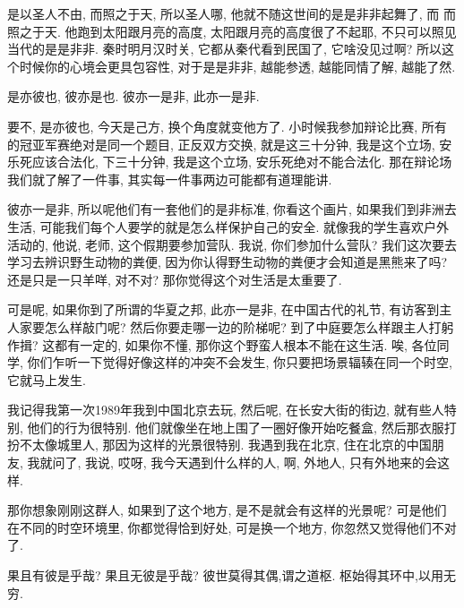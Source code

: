 \documentclass[11pt]{article}
\begin{document}
{\color{blue} 是以圣人不由, 而照之于天,} 所以圣人哪, 他就不随这世间的是是非非起舞了, 而{\color{blue} 而照之于天}. 他跑到太阳跟月亮的高度, 太阳跟月亮的高度很了不起耶, 不只可以照见当代的是是非非. 秦时明月汉时关, 它都从秦代看到民国了, 它啥没见过啊? 所以这个时候你的心境会更具包容性, 对于是是非非, 越能参透, 越能同情了解, 越能了然.

\begin{center}
	{\color{green} 是亦彼也, 彼亦是也. 彼亦一是非, 此亦一是非.}
\end{center}

\vspace{-0.5cm}

要不, {\color{blue} 是亦彼也}, 今天是己方, 换个角度就变他方了. 小时候我参加辩论比赛, 所有的冠亚军赛绝对是同一个题目, 正反双方交换, 就是这三十分钟, 我是这个立场, 安乐死应该合法化, 下三十分钟, 我是这个立场, 安乐死绝对不能合法化. 那在辩论场我们就了解了一件事, 其实每一件事两边可能都有道理能讲. 

{\color{blue} 彼亦一是非,} 所以呢他们有一套他们的是非标准, 你看这个画片, 如果我们到非洲去生活, 可能我们每个人要学的就是怎么样保护自己的安全. 就像我的学生喜欢户外活动的, 他说, 老师, 这个假期要参加营队. 我说, 你们参加什么营队? 我们这次要去学习去辨识野生动物的粪便, 因为你认得野生动物的粪便才会知道是黑熊来了吗? 还是只是一只羊咩, 对不对? 那你觉得这个对生活是太重要了.

可是呢, 如果你到了所谓的华夏之邦, {\color{blue} 此亦一是非}, 在中国古代的礼节, 有访客到主人家要怎么样敲门呢? 然后你要走哪一边的阶梯呢? 到了中庭要怎么样跟主人打躬作揖? 这都有一定的, 如果你不懂, 那你这个野蛮人根本不能在这生活. 唉, 各位同学, 你们乍听一下觉得好像这样的冲突不会发生, 你只要把场景辐辏在同一个时空, 它就马上发生.

我记得我第一次1989年我到中国北京去玩, 然后呢, 在长安大街的街边, 就有些人特别, 他们的行为很特别. 他们就像坐在地上围了一圈好像开始吃餐盒, 然后那衣服打扮不太像城里人, 那因为这样的光景很特别. 我遇到我在北京, 住在北京的中国朋友, 我就问了, 我说, 哎呀, 我今天遇到什么样的人, 啊, 外地人, 只有外地来的会这样. 

那你想象刚刚这群人, 如果到了这个地方, 是不是就会有这样的光景呢? 可是他们在不同的时空环境里, 你都觉得恰到好处, 可是换一个地方, 你忽然又觉得他们不对了.

\begin{center}
	{\color{green} 果且有彼是乎哉? 果且无彼是乎哉? 彼世莫得其偶,谓之道枢. 枢始得其环中,以用无穷.}
\end{center}

\vspace{-0.5cm}
\end{document}
